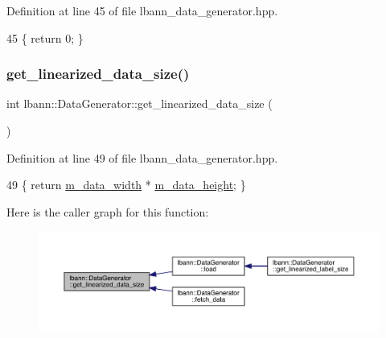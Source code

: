 Definition at line 45 of file lbann\+\_\+data\+\_\+generator.\+hpp.


\begin{DoxyCode}
45 \{ \textcolor{keywordflow}{return} 0; \}
\end{DoxyCode}
\mbox{\label{classlbann_1_1DataGenerator_ad24923ec94dc5b6575b50b74adbefc28}} 
\subsubsection{\texorpdfstring{get\+\_\+linearized\+\_\+data\+\_\+size()}{get\_linearized\_data\_size()}}
{\footnotesize\ttfamily int lbann\+::\+Data\+Generator\+::get\+\_\+linearized\+\_\+data\+\_\+size (\begin{DoxyParamCaption}{ }\end{DoxyParamCaption})\hspace{0.3cm}{\ttfamily [inline]}}



Definition at line 49 of file lbann\+\_\+data\+\_\+generator.\+hpp.


\begin{DoxyCode}
49 \{ \textcolor{keywordflow}{return} \hyperlink{classlbann_1_1DataGenerator_a054cb6ab0d93ec57419a81734ddf04aa}{m\_data\_width} * \hyperlink{classlbann_1_1DataGenerator_a676e679d18eb0523be714345205c662d}{m\_data\_height}; \}
\end{DoxyCode}
Here is the caller graph for this function\+:\nopagebreak
\begin{figure}[H]
\begin{center}
\leavevmode
\includegraphics[width=350pt]{classlbann_1_1DataGenerator_ad24923ec94dc5b6575b50b74adbefc28_icgraph}
\end{center}
\end{figure}
\mbox{\label{classlbann_1_1DataGenerator_a47c97d76cf83d53ef298f5ad5115e6cc}} 
